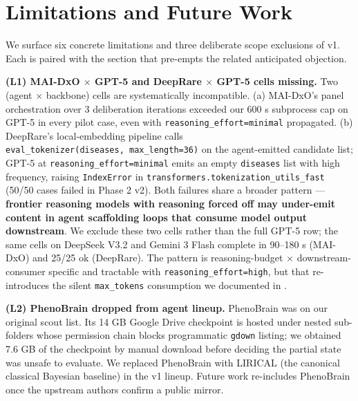 \section{Limitations and Future Work}\label{sec-9}

We surface six concrete limitations and three deliberate scope exclusions
of v1. Each is paired with the section that pre-empts the related
anticipated objection.

\textbf{(L1) MAI-DxO \ensuremath{\times} GPT-5 and DeepRare \ensuremath{\times} GPT-5 cells missing.} Two
(agent \ensuremath{\times} backbone) cells are systematically incompatible. (a) MAI-DxO's
panel orchestration over 3 deliberation iterations exceeded our 600 s
subprocess cap on GPT-5 in every pilot case, even with
\texttt{reasoning\_effort=minimal} propagated. (b) DeepRare's local-embedding
pipeline calls \texttt{eval\_tokenizer(diseases,\ max\_length=36)} on the
agent-emitted candidate list; GPT-5 at \texttt{reasoning\_effort=minimal}
emits an empty \texttt{diseases} list with high frequency, raising
\texttt{IndexError} in \texttt{transformers.tokenization\_utils\_fast} (50/50 cases
failed in Phase 2 v2). Both failures share a broader pattern ---
\textbf{frontier reasoning models with reasoning forced off may under-emit content in agent scaffolding loops that consume model output downstream}. We exclude these two cells rather than the full GPT-5
row; the same cells on DeepSeek V3.2 and Gemini 3 Flash complete in
90--180 s (MAI-DxO) and 25/25 ok (DeepRare). The pattern is
reasoning-budget \ensuremath{\times} downstream-consumer specific and tractable with
\texttt{reasoning\_effort=high}, but that re-introduces the silent
\texttt{max\_tokens} consumption we documented in .

\textbf{(L2) PhenoBrain dropped from agent lineup.} PhenoBrain
\citep{phenobrain2025} was on our original scout list. Its 14 GB Google
Drive checkpoint is hosted under nested sub-folders whose permission
chain blocks programmatic \texttt{gdown} listing; we obtained 7.6 GB of the
checkpoint by manual download before deciding the partial state was
unsafe to evaluate. We replaced PhenoBrain with LIRICAL (the canonical
classical Bayesian baseline) in the v1 lineup. Future work re-includes
PhenoBrain once the upstream authors confirm a public mirror.

